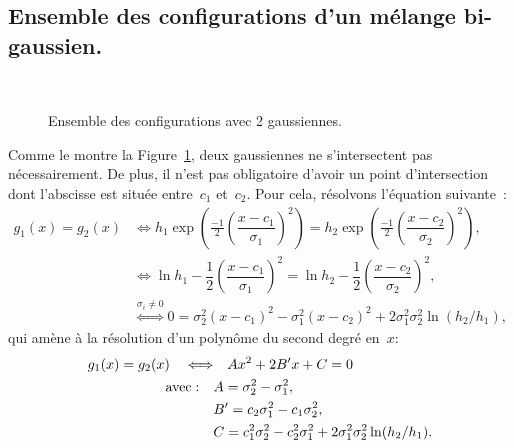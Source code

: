 \documentclass[main.tex]{subfiles}
\begin{document}
\subsection{Ensemble des configurations d'un mélange bi-gaussien. \label{sec:config_gmm}}
\begin{figure}[ht]
\centering
{}\qquad
{}\\
\qquad
{}
\caption{\label{fig:config_intersection_gaussienne}Ensemble des configurations avec 2 gaussiennes.}
\end{figure}
Comme le montre la Figure~\ref{fig:config_intersection_gaussienne}, deux gaussiennes ne s'intersectent pas nécessairement. De plus, il n'est pas obligatoire d'avoir un point d'intersection dont l'abscisse est située entre~$c_1$ et~$c_2$. Pour cela, résolvons l'équation suivante~:
\begin{align*}
g_1(x)=g_2(x) 
& \Leftrightarrow h_1\exp \left(\frac{-1}{2} \left( \dfrac{x-c_1}{\sigma_1}\right)^2  \right) = h_2\exp \left(\frac{-1}{2} \left( \dfrac{x-c_2}{\sigma_2}\right)^2  \right), \\
& \Leftrightarrow \ln h_1 - \dfrac{1}{2}\left( \dfrac{x-c_1}{\sigma_1} \right)^2 = \ln h_2 - \dfrac{1}{2}\left( \dfrac{x-c_2}{\sigma_2} \right)^2, \\
& \overset{\sigma_i \neq 0}{\Leftrightarrow} 0 = \sigma_2^2 (x-c_1)^2 - \sigma_1^2 (x-c_2)^2 + 2\sigma_1^2\sigma_2^2 \ln( h_2 / h_1 ),
\end{align*}
qui amène à la résolution d'un polynôme du second degré en~$x$:
\begin{equation}
\begin{aligned}
\label{eq:g1=g2}
g_1(x)=g_2(x) \quad \Longleftrightarrow & \quad  Ax^2 + 2B'x + C =0 \\
{\rm avec :} \quad &A=\sigma_2^2 - \sigma_1^2, \\
& B'=c_2\sigma_1^2-c_1\sigma_2^2,\\
& C= c_1^2\sigma_2^2-c_2^2\sigma_1^2 +  2\sigma_1^2\sigma_2^2 \ln( h_2 / h_1 ).
\end{aligned}
\end{equation}
\end{document}
